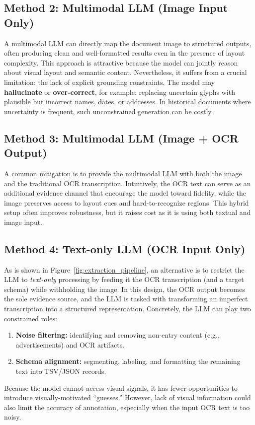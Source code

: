 \subsection{Method 2: Multimodal LLM (Image Input Only)}
A multimodal LLM can directly map the document image to structured outputs, often producing clean and well-formatted results even in the presence of layout complexity. This approach is attractive because the model can jointly reason about visual layout and semantic content.
Nevertheless, it suffers from a crucial limitation: the lack of explicit grounding constraints. The model may \textbf{hallucinate} or \textbf{over-correct}, for example:
 replacing uncertain glyphs with plausible but incorrect names, dates, or addresses.
In historical documents where uncertainty is frequent, such unconstrained generation can be costly.

\subsection{Method 3: Multimodal LLM (Image + OCR Output)}
A common mitigation is to provide the multimodal LLM with both the image and the traditional OCR transcription. Intuitively, the OCR text can serve as an additional evidence channel that encourage the model toward fidelity, while the image preserves access to layout cues and hard-to-recognize regions.
This hybrid setup often improves robustness, but it raises cost as it is using both textual and image input.

\subsection{Method 4: Text-only LLM (OCR Input Only)}
As is shown in Figure~\ref{fig:extraction_pipeline}, an alternative is to restrict the LLM to \emph{text-only} processing by feeding it the OCR transcription (and a target schema) while withholding the image. In this design, the OCR output becomes the sole evidence source, and the LLM is tasked with transforming an imperfect transcription into a structured representation.
Concretely, the LLM can play two constrained roles:
\begin{enumerate}
    \item \textbf{Noise filtering:} identifying and removing non-entry content (e.g., advertisements) and OCR artifacts.
    \item \textbf{Schema alignment:} segmenting, labeling, and formatting the remaining text into TSV/JSON records.
\end{enumerate}
Because the model cannot access visual signals, it has fewer opportunities to introduce visually-motivated ``guesses.'' However, lack of visual information could also limit the accuracy of annotation, especially when the input OCR text is too noisy.

